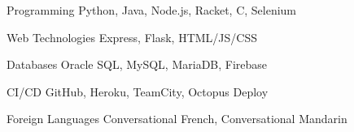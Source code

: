 

\begin{cvskills}

  \cvskill
  {Programming} %
  {Python, Java, Node.js, Racket, C, Selenium} %

  \cvskill
  {Web Technologies} %
  {Express, Flask, HTML/JS/CSS} %

  \cvskill
  {Databases} %
  {Oracle SQL, MySQL, MariaDB, Firebase} %


  \cvskill
  {CI/CD} %
  {GitHub, Heroku, TeamCity, Octopus Deploy} %

  \cvskill
  {Foreign Languages} %
  {Conversational French, Conversational Mandarin} %

\end{cvskills}
